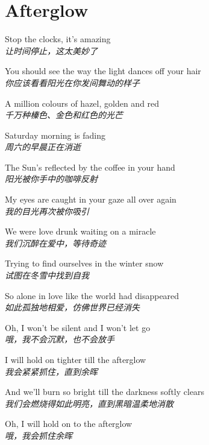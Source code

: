 \section{Afterglow}

\thispagestyle{empty}


\begin{spacing}{1.5}
\begin{flushleft}
Stop the clocks, it's amazing\\
\textit{让时间停止，这太美妙了}\lyricspace

You should see the way the light dances off your hair\\
\textit{你应该看看阳光在你发间舞动的样子}\lyricspace

A million colours of hazel, golden and red\\
\textit{千万种榛色、金色和红色的光芒}\lyricspace

Saturday morning is fading\\
\textit{周六的早晨正在消逝}\lyricspace

The Sun's reflected by the coffee in your hand\\
\textit{阳光被你手中的咖啡反射}\lyricspace

My eyes are caught in your gaze all over again\\
\textit{我的目光再次被你吸引}\lyricspace

We were love drunk waiting on a miracle\\
\textit{我们沉醉在爱中，等待奇迹}\lyricspace

Trying to find ourselves in the winter snow\\
\textit{试图在冬雪中找到自我}\lyricspace

So alone in love like the world had disappeared\\
\textit{如此孤独地相爱，仿佛世界已经消失}\lyricspace

Oh, I won't be silent and I won't let go\\
\textit{哦，我不会沉默，也不会放手}\lyricspace

I will hold on tighter till the afterglow\\
\textit{我会紧紧抓住，直到余晖}\lyricspace

And we'll burn so bright till the darkness softly clears\\
\textit{我们会燃烧得如此明亮，直到黑暗温柔地消散}\lyricspace

Oh, I will hold on to the afterglow\\
\textit{哦，我会抓住余晖}\lyricspace


\end{flushleft}
\end{spacing}
